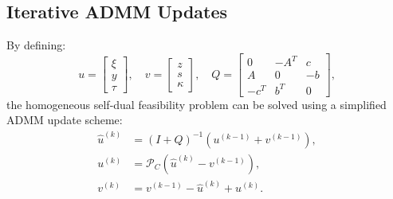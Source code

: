 \documentclass[12pt]{l4dc2021}
\begin{document}
    \subsection{Iterative ADMM Updates}
        By defining:
        \begin{equation}
            u = \begin{bmatrix} \xi \\ y \\ \tau \end{bmatrix}, \quad
            v = \begin{bmatrix} z \\ s \\ \kappa \end{bmatrix}, \quad
            Q = \begin{bmatrix} 0 & -A^T & c \\ A & 0 & -b \\ -c^T & b^T & 0 \end{bmatrix},
        \end{equation}
        the homogeneous self-dual feasibility problem can be solved using a simplified ADMM update scheme:
        \begin{align}
            \hat{u}^{(k)} &= (I + Q)^{-1} ( u^{(k-1)} + v^{(k-1)} ), \label{eq:admm_u_hat}\\
            u^{(k)} &= \mathcal{P}_C \left( \hat{u}^{(k)} - v^{(k-1)} \right), \\
            v^{(k)} &= v^{(k-1)} - \hat{u}^{(k)} + u^{(k)}.
        \end{align}
    
\end{document}
